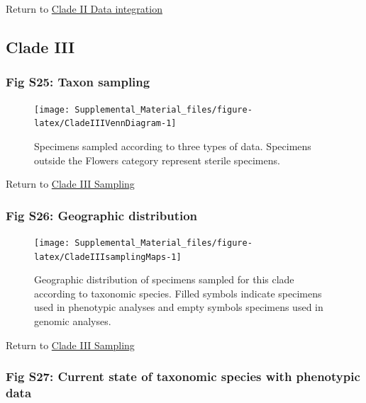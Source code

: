 \documentclass[
  11pt,
]{article}
\begin{document}
Return to \protect\hyperlink{data-integration-2}{Clade II Data integration}
\pagebreak

\hypertarget{clade-iii-2}{%
\subsection{Clade III}\label{clade-iii-2}}

\hypertarget{fig-s25-taxon-sampling}{%
\subsubsection{Fig S25: Taxon sampling}\label{fig-s25-taxon-sampling}}

\begin{figure}

{\centering \texttt{[image: Supplemental\_Material\_files/figure-latex/CladeIIIVennDiagram-1]} 

}

\caption{Specimens sampled according to three types of data. Specimens outside the Flowers category represent sterile specimens.}\label{fig:CladeIIIVennDiagram}
\end{figure}

Return to \protect\hyperlink{sampling-3}{Clade III Sampling}
\pagebreak

\hypertarget{fig-s26-geographic-distribution}{%
\subsubsection{Fig S26: Geographic distribution}\label{fig-s26-geographic-distribution}}

\begin{figure}

{\centering \texttt{[image: Supplemental\_Material\_files/figure-latex/CladeIIIsamplingMaps-1]} 

}

\caption{Geographic distribution of specimens sampled for this clade according to taxonomic species. Filled symbols indicate specimens used in phenotypic analyses and empty symbols specimens used in genomic analyses.}\label{fig:CladeIIIsamplingMaps}
\end{figure}

Return to \protect\hyperlink{sampling-3}{Clade III Sampling}
\pagebreak

\hypertarget{fig-s27-current-state-of-taxonomic-species-with-phenotypic-data}{%
\subsubsection{Fig S27: Current state of taxonomic species with phenotypic data}\label{fig-s27-current-state-of-taxonomic-species-with-phenotypic-data}}
\end{document}
